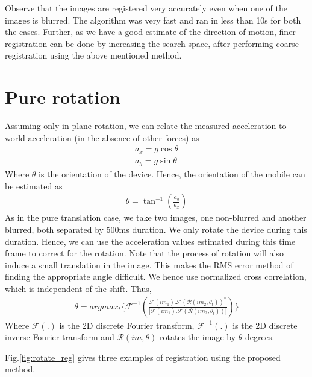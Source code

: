 \documentclass[BTech]{iitmdiss}
\begin{document}
Observe that the images are registered very accurately even when one of
the images is blurred. The algorithm was very fast and ran in less than
10s for both the cases. Further, as we have a good estimate of the 
direction of motion, finer registration can be done by increasing the
search space, after performing coarse registration using the above mentioned
method.

\section{Pure rotation}
\label{image_registration:pure_rotation}
Assuming only in-plane rotation, we can relate the measured acceleration
to world acceleration (in the absence of other forces) as
\begin{align*}
a_x=g\cos\theta\\
a_y=g\sin\theta
\end{align*}
Where $\theta$ is the orientation of the device. Hence, the orientation
of the mobile can be estimated as
\begin{align*}
\theta=\tan^{-1}(\frac{a_y}{a_x})
\end{align*}
As in the pure translation case, we take two images, one non-blurred and
another blurred, both separated by 500ms duration. We only rotate the 
device during this duration. Hence, we can use the acceleration values
estimated during this time frame to correct for the rotation. Note that
the process of rotation will also induce a small translation in the 
image. This makes the RMS error method of finding the appropriate
angle difficult. We hence use normalized cross correlation, which is 
independent of the shift. Thus,
\begin{align*}
\theta=argmax_t\big\{\mathcal{F}^{-1}\left(\frac{\mathcal{F}(im_1).\mathcal{F}(\mathcal{R}(im_2,\theta_t))^*}
{|\mathcal{F}(im_1).\mathcal{F}(\mathcal{R}(im_2,\theta_t))|}\right)\}
\end{align*}
Where $\mathcal{F}(.)$ is the 2D discrete Fourier transform,
$\mathcal{F}^{-1}(.)$ is the 2D 
discrete inverse Fourier transform and $\mathcal{R}(im, \theta)$ rotates the
image by $\theta$ degrees.

Fig.\ref{fig:rotate_reg} gives three examples of registration using the
proposed method. 
\end{document}
